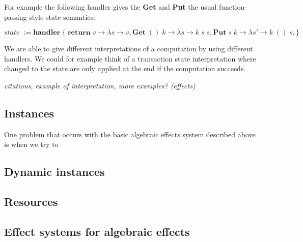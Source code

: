 For example the following handler gives the \textbf{Get} and \textbf{Put} the usual function-passing style state semantics:

\[ \textit{state} \; := \textbf{handler} \; \{ \;
  \textbf{return} \; v \rightarrow \lambda s \rightarrow v,
  \textbf{Get} \; () \; k \rightarrow \lambda s \rightarrow k \; s \; s,
  \textbf{Put} \; s \; k \rightarrow \lambda s' \rightarrow k \; () \; s,
\} \]

We are able to give different interpretations of a computation by using different handlers.
We could for example think of a transaction state interpretation where changed to the state are only applied at the end if the computation succeeds.

\textit{
citations,
example of interpretation,
more examples? (effects)
}

\subsection{Instances}
One problem that occurs with the basic algebraic effects system described above is when we try to 

\subsection{Dynamic instances}
\subsection{Resources}
\subsection{Effect systems for algebraic effects}
